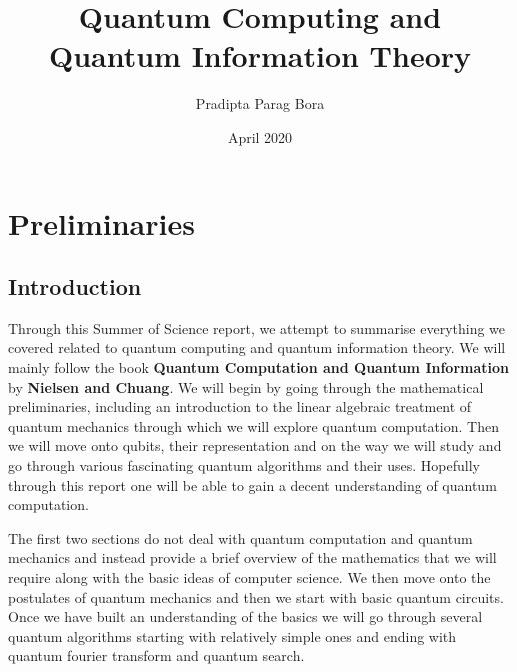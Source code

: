\documentclass{report}
\title{Quantum Computing and Quantum Information Theory}
\author{Pradipta Parag Bora}
\date{April 2020}
\numberwithin{equation}{section}
\theoremstyle{definition}
\numberwithin{definition}{section}
\numberwithin{theorem}{section}
\theoremstyle{remark}
\numberwithin{exercise}{section}
\begin{document}


\tableofcontents

\part{Preliminaries}
\chapter{Introduction}
Through this Summer of Science report, we attempt to summarise everything we covered related to quantum computing and quantum information theory. We will mainly follow the book \textbf{Quantum Computation and Quantum Information} by \textbf{Nielsen and Chuang}. We will begin by going through the mathematical preliminaries, including an introduction to the linear algebraic treatment of quantum mechanics through which we will explore quantum computation. Then we will move onto qubits, their representation and on the way we will study and go through various fascinating quantum algorithms and their uses. Hopefully through this report one will be able to gain a decent understanding of quantum computation. 

The first two sections do not deal with quantum computation and quantum mechanics and instead provide a brief overview of the mathematics that we will require along with the basic ideas of computer science. We then move onto the postulates of quantum mechanics and then we start with basic quantum circuits. Once we have built an understanding of the basics we will go through several quantum algorithms starting with relatively simple ones and ending with quantum fourier transform and quantum search.
\clearpage












\end{document}
